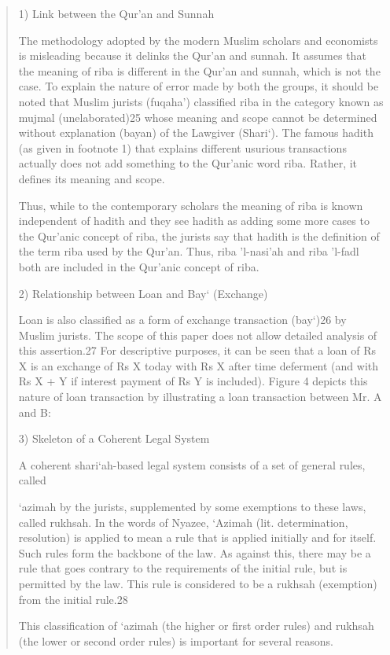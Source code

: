\begin{quote}
1) Link between the Qur'an and Sunnah

The methodology adopted by the modern Muslim scholars and economists is misleading because it delinks the Qur'an and sunnah. It assumes that the meaning of riba is different in the Qur'an and sunnah, which is not the case. To explain the nature of error made by both the groups, it should be noted that Muslim jurists (fuqaha') classified riba in the category known as mujmal (unelaborated)25 whose meaning and scope cannot be determined without explanation (bayan) of the Lawgiver (Shari‘). The famous hadith (as given in footnote 1) that explains different usurious transactions actually does not add something to the Qur'anic word riba. Rather, it defines its meaning and scope.

Thus, while to the contemporary scholars the meaning of riba is known independent of hadith and they see hadith as adding some more cases to the Qur'anic concept of riba, the jurists say that hadith is the definition of the term riba used by the Qur'an. Thus, riba 'l-nasi'ah and riba 'l-fadl both are included in the Qur'anic concept of riba.

2) Relationship between Loan and Bay‘ (Exchange)

Loan is also classified as a form of exchange transaction (bay‘)26 by Muslim jurists. The scope of this paper does not allow detailed analysis of this assertion.27 For descriptive purposes, it can be seen that a loan of Rs X is an exchange of Rs X today with Rs X after time deferment (and with Rs X + Y if interest payment of Rs Y is included). Figure 4 depicts this nature of loan transaction by illustrating a loan transaction between Mr. A and B:

3) Skeleton of a Coherent Legal System

A coherent shari‘ah-based legal system consists of a set of general rules, called

‘azimah by the jurists, supplemented by some exemptions to these laws, called rukhsah. In the words of Nyazee, ‘Azimah (lit. determination, resolution) is applied to mean a rule that is applied initially and for itself. Such rules form the backbone of the law. As against this, there may be a rule that goes contrary to the requirements of the initial rule, but is permitted by the law. This rule is considered to be a rukhsah (exemption) from the initial rule.28

This classification of ‘azimah (the higher or first order rules) and rukhsah (the lower or second order rules) is important for several reasons.


\end{quote}
